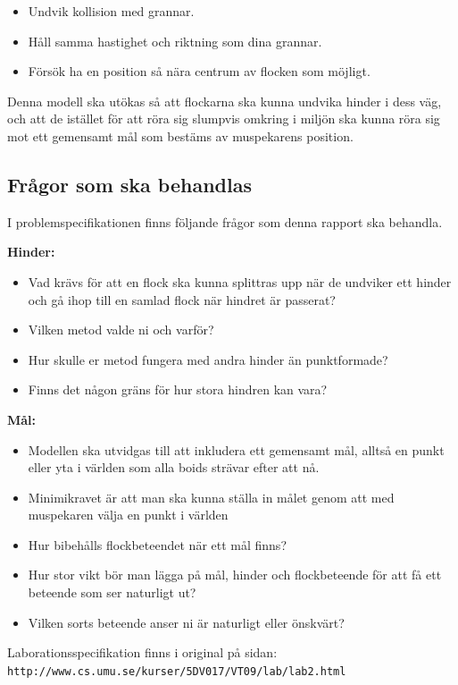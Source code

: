 \documentclass[titlepage, a4paper, 12pt]{article}
\begin{document}
\begin{itemize}
\item Undvik kollision med grannar.
\item Håll samma hastighet och riktning som dina grannar.
\item Försök ha en  position så nära centrum av flocken som möjligt.
\end{itemize}

Denna modell ska utökas så att flockarna ska kunna undvika hinder i
dess väg, och att de istället för att röra sig slumpvis omkring i
miljön ska kunna röra sig mot ett gemensamt mål som bestäms av
muspekarens position.

\subsection{Frågor som ska behandlas}
I problemspecifikationen finns följande frågor som denna rapport ska
behandla.

\textbf{Hinder:}
\begin{itemize}
\item Vad krävs för att en flock ska kunna splittras upp när de
  undviker ett hinder och gå ihop till en samlad flock när hindret är
  passerat?
\item Vilken metod valde ni och varför?
\item Hur skulle er metod fungera med andra hinder än punktformade?
\item Finns det någon gräns för hur stora hindren kan vara?
\end{itemize}

\textbf{Mål:}
\begin{itemize}
\item Modellen ska utvidgas till att inkludera ett gemensamt mål,
  alltså en punkt eller yta i världen som alla boids strävar efter att
  nå.
\item Minimikravet är att man ska kunna ställa in målet genom att med
  muspekaren välja en punkt i världen
\item Hur bibehålls flockbeteendet när ett mål finns?
\item Hur stor vikt bör man lägga på mål, hinder och flockbeteende för
  att få ett beteende som ser naturligt ut?
\item Vilken sorts beteende anser ni är naturligt eller önskvärt? 
\end{itemize}

Laborationsspecifikation finns i original på sidan:\\
\verb!http://www.cs.umu.se/kurser/5DV017/VT09/lab/lab2.html!
\end{document}
